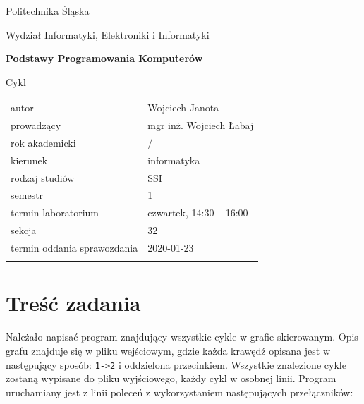 \documentclass[12pt,a4paper]{article}
\newcounter{rok}
\newcommand{\rokakademicki}{%
   \setcounter{rok}{\number\year}%
   \ifthenelse{\number\month<10}%
   {\addtocounter{rok}{-1}}%
   {}%
   \arabic{rok}/\addtocounter{rok}{1}\arabic{rok}
}
\begin{document}
\frenchspacing
\thispagestyle{empty}
\begin{center}
{\Large\sf Politechnika Śląska   %

Wydział Informatyki, Elektroniki i Informatyki

}

\vfill

 

\vfill\vfill

{\Huge\sffamily\bfseries Podstawy Programowania Komputerów\par}  

\vfill\vfill

{\LARGE\sf Cykl}   


\vfill \vfill\vfill\vfill






\begin{tabular}{ll}
	\toprule
	autor                       & Wojciech Janota     \\
	prowadzący                  & mgr inż. Wojciech Łabaj  \\
	rok akademicki              & \rokakademicki         \\
	kierunek                    & informatyka            \\
	rodzaj studiów              & SSI                    \\
	semestr                     & 1                      \\
	termin laboratorium         & czwartek, 14:30 -- 16:00 \\
	sekcja                      & 32                     \\
	termin oddania sprawozdania & 2020-01-23             \\
	\bottomrule
	                            &
\end{tabular}

\end{center}

\cleardoublepage

\section{Treść zadania}
Należało napisać program znajdujący wszystkie cykle w grafie skierowanym. Opis grafu znajduje się w pliku wejściowym, gdzie każda krawędź opisana jest w następujący sposób: \texttt{1->2} i oddzielona przecinkiem.
Wszystkie znalezione cykle zostaną wypisane do pliku wyjściowego, każdy cykl w osobnej linii.
Program uruchamiany jest z linii poleceń z wykorzystaniem następujących przełączników:
 
\end{document}
